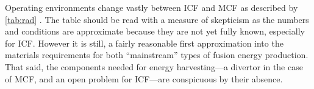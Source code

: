 Operating environments change vastly between ICF and MCF as described by \cref{tab:rad} \cite{openv}. The table should be read with a measure of skepticism as the numbers and conditions are approximate because they are not yet fully known, especially for ICF. However it is still, a fairly reasonable first approximation into the materials requirements for both ``mainstream'' types of fusion energy production. That said, the components needed for energy harvesting---a divertor in the case of MCF, and an open problem for ICF---are conspicuous by their absence.

\begin{table}
    \centering
\end{table}
